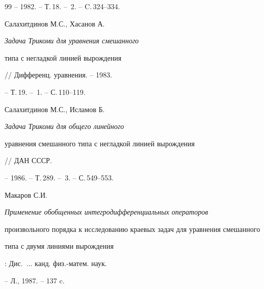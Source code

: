 \begin{thebibliography}{99}
-- 1982. -- Т.\,18. -- \No\,2. -- C.\,324--334. 




Салахитдинов М.С., Хасанов А. {\em Задача Трикоми для уравнения смешанного


типа с негладкой линией вырождения} // Дифференц. уравнения. -- 1983.


-- Т.\,19. -- \No\,1. -- С.\,110--119.




Салахитдинов М.С., Исламов Б. {\em Задача Трикоми для общего линейного


уравнения смешанного типа с негладкой линией вырождения} // ДАН СССР.


-- 1986. -- Т.\,289. -- \No\,3. -- С.\,549--553.




Макаров С.И. {\em Применение обобщенных интегродифференциальных операторов 


произвольного порядка к исследованию краевых задач для уравнения смешанного 


типа с двумя линиями вырождения}: Дис.~$\dotsc$ канд. физ.-матем. наук.


-- Л., 1987. -- 137 c.





\end{thebibliography}





\vskip 2cm









\smallskip









\label{end}





